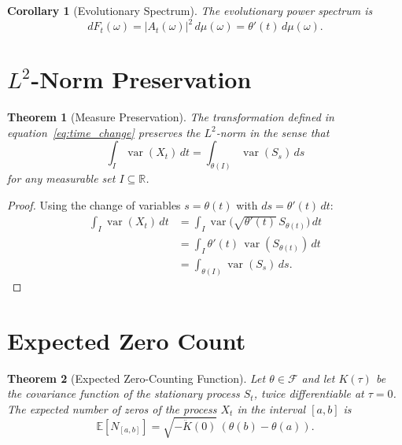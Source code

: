 \documentclass[11pt]{article}
\newtheorem{theorem}{Theorem}
\newtheorem{corollary}{Corollary}
\begin{document}
\begin{corollary}[Evolutionary Spectrum]\label{cor:evolving_spec}
The evolutionary power spectrum is
\begin{equation}\label{eq:evolutionary_spec}
    dF_t(\omega)=\lvert A_t(\omega)\rvert^2\,d\mu(\omega)=\theta'(t)\,d\mu(\omega).
\end{equation}
\end{corollary}

\section{$L^2$-Norm Preservation}\label{sec:norm_preservation}

\begin{theorem}[Measure Preservation]\label{thm:measure_preserve}
The transformation defined in equation~\eqref{eq:time_change} preserves the $L^2$-norm in the sense that
\begin{equation}\label{eq:measure_preserve}
    \int_I \operatorname{var}(X_t)\,dt = \int_{\theta(I)} \operatorname{var}(S_s)\,ds
\end{equation}
for any measurable set $I\subseteq\mathbb{R}$.
\end{theorem}

\begin{proof}
Using the change of variables $s=\theta(t)$ with $ds=\theta'(t)\,dt$:
\begin{align}
    \int_I \operatorname{var}(X_t)\,dt &= \int_I \operatorname{var}\bigl(\sqrt{\theta'(t)}\,S_{\theta(t)}\bigr)\,dt\\
    &= \int_I \theta'(t)\,\operatorname{var}(S_{\theta(t)})\,dt\\
    &= \int_{\theta(I)} \operatorname{var}(S_s)\,ds.
\end{align}
\end{proof}

\section{Expected Zero Count}\label{sec:zero_count}

\begin{theorem}[Expected Zero-Counting Function]\label{thm:zero_count}
Let $\theta\in\mathcal{F}$ and let $K(\tau)$ be the covariance function of the stationary process $S_t$, twice differentiable at $\tau=0$. The expected number of zeros of the process $X_t$ in the interval $[a,b]$ is
\begin{equation}\label{eq:zero_count}
    \mathbb{E}[N_{[a,b]}] = \sqrt{-\ddot{K}(0)}\,(\theta(b)-\theta(a)).
\end{equation}
\end{theorem}
\end{document}
